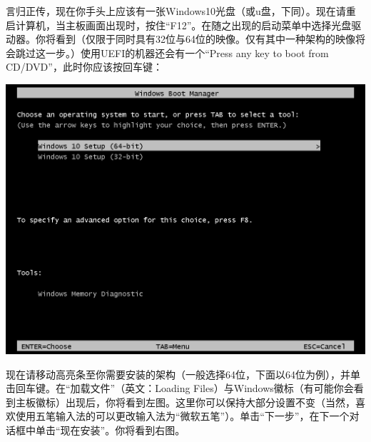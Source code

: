 言归正传，现在你手头上应该有一张Windows10光盘（或u盘，下同）。现在请重启计算机，当主板画面出现时，按住“F12”。在随之出现的启动菜单中选择光盘驱动器。你将看到（仅限于同时具有32位与64位的映像。仅有其中一种架构的映像将会跳过这一步。）使用UEFI的机器还会有一个“Press any key to boot from CD/DVD”，此时你应该按回车键：
\begin{center}
	\includegraphics[scale=0.4]{pic/win10setup1}
\end{center} \par
现在请移动高亮条至你需要安装的架构（一般选择64位，下面以64位为例），并单击回车键。在“加载文件”（英文：Loading Files）与Windows徽标（有可能你会看到主板徽标）出现后，你将看到左图。这里你可以保持大部分设置不变（当然，喜欢使用五笔输入法的可以更改输入法为“微软五笔”）。单击“下一步”，在下一个对话框中单击“现在安装”。你将看到右图。
